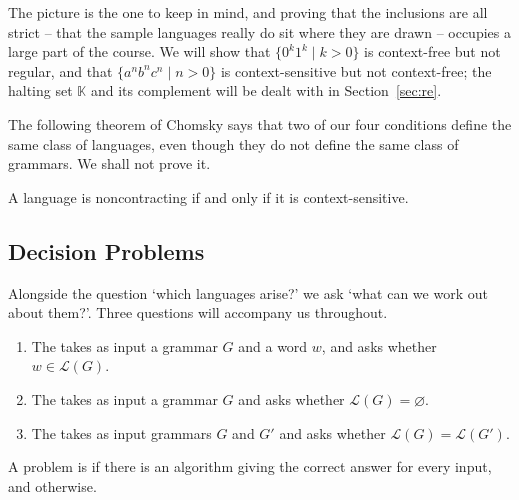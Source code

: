 \documentclass[a4paper]{scrartcl}
\newcommand{\WW}{\mathbb{W}}
\newcommand{\KK}{\mathbb{K}}
\newcommand{\lang}{\mathcal{L}}
\begin{document}
\begin{center}
\end{center}

The picture is the one to keep in mind, and proving that the inclusions are all strict -- that the sample languages really do sit where they are drawn -- occupies a large part of the course. We will show that $\{0^k1^k \mid k > 0\}$ is context-free but not regular, and that $\{a^nb^nc^n \mid n > 0\}$ is context-sensitive but not context-free; the halting set $\KK$ and its complement will be dealt with in Section~\ref{sec:re}.

The following theorem of Chomsky says that two of our four conditions define the same class of languages, even though they do not define the same class of grammars. We shall not prove it.

\begin{theorem}[Chomsky]
	A language is noncontracting if and only if it is context-sensitive.
\end{theorem}

\subsection{Decision Problems}

Alongside the question `which languages arise?' we ask `what can we work out about them?'. Three questions will accompany us throughout.

\begin{definition}
	\begin{enumerate}[label=(\roman*)]
		\item The  takes as input a grammar $G$ and a word $w$, and asks whether $w \in \lang(G)$.
		\item The  takes as input a grammar $G$ and asks whether $\lang(G) = \varnothing$.
		\item The  takes as input grammars $G$ and $G'$ and asks whether $\lang(G) = \lang(G')$.
	\end{enumerate}
	A problem is  if there is an algorithm giving the correct answer for every input, and  otherwise.
\end{definition}
\end{document}
